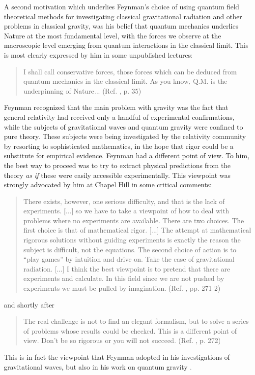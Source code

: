 \documentclass{ws-procs961x669}            %
\begin{document}
A second motivation which underlies Feynman's choice of using
quantum field theoretical methods for investigating classical
gravitational radiation and other problems in classical gravity,
was his belief that quantum mechanics underlies Nature at the most
fundamental level, with the forces we observe at the macroscopic
level emerging from quantum interactions in the classical limit.
This is most clearly expressed by him in some unpublished
lectures:
%
\begin{quote}
I shall call conservative forces, those forces which can be
deduced from quantum mechanics in the classical limit. As you
know, Q.M. is the underpinning of Nature... (Ref.
, p. 35)
\end{quote}
%
Feynman recognized that the main problem with gravity was the fact
that general relativity had received only a handful of
experimental confirmations, while the subjects of gravitational
waves and quantum gravity were confined to pure theory. These
subjects were being investigated by the relativity community by
resorting to sophisticated mathematics, in the hope that rigor
could be a substitute for empirical evidence. Feynman had a
different point of view. To him, the best way to proceed was to
try to extract physical predictions from the theory \emph{as if}
these were easily accessible experimentally. This viewpoint was
strongly advocated by him at Chapel Hill in some critical
comments:
%
\begin{quote}
There exists, however, one serious difficulty, and that is the
lack of experiments. [...] so we have to take a viewpoint of how
to deal with problems where no experiments are available. There
are two choices. The first choice is that of mathematical rigor.
[...] The attempt at mathematical rigorous solutions without
guiding experiments is exactly the reason the subject is
difficult, not the equations. The second choice of action is to
``play games'' by intuition and drive on. Take the case of
gravitational radiation. [...] I think the best viewpoint is to
pretend that there are experiments and calculate. In this field
since we are not pushed by experiments we must be pulled by
imagination. (Ref. , pp. 271-2)
\end{quote}
and shortly after
%
\begin{quote}
The real challenge is not to find an elegant formalism, but to
solve a series of problems whose results could be checked. This is
a different point of view. Don't be so rigorous or you will not
succeed. (Ref. , p. 272)
\end{quote}
%
This is in fact the viewpoint that Feynman adopted in his
investigations of gravitational waves, but also in his work on
quantum gravity \cite{DiMauro:2021yza}.
\end{document}
